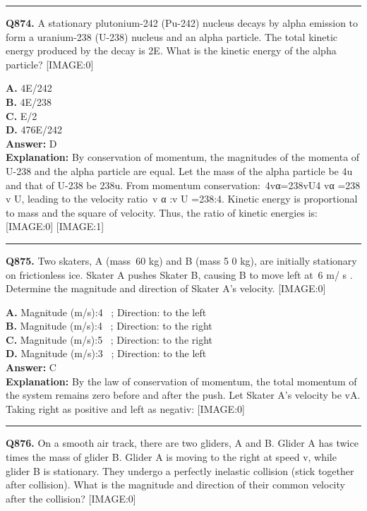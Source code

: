 \documentclass[12pt]{article}
\begin{document}
\hrule
\vspace{1em}


\noindent
\textbf{Q874.} A stationary plutonium-242 (Pu-242) nucleus decays by alpha emission to form a uranium-238 (U-238) nucleus and an alpha particle. The total kinetic energy produced by the decay is 2E.
What is the kinetic energy of the alpha particle?
[IMAGE:0]



\textbf{A.} 4E/242 \\
\textbf{B.} 4E/238 \\
\textbf{C.} E/2 \\
\textbf{D.} 476E/242 \\

\textbf{Answer:} D \\
\textbf{Explanation:} By conservation of momentum, the magnitudes of the momenta of U-238 and the alpha particle are equal. Let the mass of the alpha particle be 4u and that of U-238 be 238u.
From momentum conservation: 4vα=238vU4
vα
​=238
v
U​, leading to the velocity ratio v
α
:v
U
=238:4. Kinetic energy is proportional to mass and the square of velocity. Thus, the ratio of kinetic energies is:
[IMAGE:0]
[IMAGE:1]

\hrule
\vspace{1em}


\noindent
\textbf{Q875.} Two skaters, A (mass 60
kg) and B (mass
5
0
kg), are initially stationary on frictionless ice. Skater A pushes Skater B, causing B to move left at 6
m/
s
. Determine the magnitude and direction of Skater A’s velocity.
[IMAGE:0]



\textbf{A.} Magnitude (m/s):4  ;
Direction:
to the left \\
\textbf{B.} Magnitude (m/s):4  ;
Direction:
to the right \\
\textbf{C.} Magnitude (m/s):5  ;
Direction:
to the right \\
\textbf{D.} Magnitude (m/s):3  ;
Direction:
to the left \\

\textbf{Answer:} C \\
\textbf{Explanation:} By the law of conservation of momentum, the total momentum of the system remains zero before and after the push.
Let Skater A’s velocity be vA. Taking right as positive and left as negativ:
[IMAGE:0]

\hrule
\vspace{1em}


\noindent
\textbf{Q876.} On a smooth air track, there are two gliders, A and B. Glider A has
twice
times the mass of glider B. Glider A is moving to the right at speed v, while glider B is stationary. They undergo a perfectly inelastic collision (stick together after collision). What is the magnitude and direction of their common velocity after the collision?
[IMAGE:0]
\end{document}
